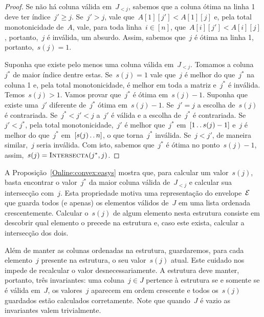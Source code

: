 \begin{proof}
Se não há coluna válida em~$J_{<j}$, sabemos que a coluna ótima na linha 1 deve ter índice~$j' \geq j$. Se~$j' > j$, vale que~${ A[1][j'] < A[1][j] }$ e, pela total monotonicidade de~$A$, vale, para toda linha~${ i \in [n] }$, que~${ A[i][j'] < A[i][j] }$, portanto,~$j$ é inválida, um absurdo. Assim, sabemos que~$j$ é ótima na linha 1, portanto,~${s(j) = 1}$.

Suponha que existe pelo menos uma coluna válida em~$J_{<j}$. Tomamos a coluna~$j^*$ de maior índice dentre estas. Se~${ s(j) = 1 }$ vale que~$j$ é melhor do que~$j^*$ na coluna 1 e, pela total monotonicidade, é melhor em toda a matriz e~$j^*$ é inválida. Temos~${ s(j) > 1 }$. Vamos provar que~$j^*$ é ótima em~${ s(j) - 1 }$. Suponha que existe uma~$j'$ diferente de~$j^*$ ótima em~$s(j) - 1$. Se~${ j' = j }$ a escolha de~$s(j)$ é contrariada. Se~${ j^* < j' < j }$ a~$j'$ é válida e a escolha de~$j^*$ é contrariada. Se~${ j' < j^* }$, pela total monotonicidade,~$j'$ é melhor que~$j^*$ em~$[1 \,.\,.\, s(j) - 1]$ e~$j$ é melhor do que~$j^*$ em~$[s(j) \,.\,.\, n]$, o que torna~$j^*$ inválida. Se~${ j < j' }$, de maneira similar,~$j$ seria inválida.  Com isto, sabemos que~$j^*$ é ótima no ponto~$s(j) - 1$, assim,~${s(j) = \textsc{Intersecta}(j^*,j)}$.
\end{proof}

A Proposição~\ref{Online:convex:easys} mostra que, para calcular um valor~$s(j)$, basta encontrar o valor~$j^*$ da maior coluna válida de~$J_{<j}$ e calcular sua intersecção com~$j$. Esta propriedade motiva uma representação do envelope~$\mathcal{E}$ que guarda todos (e apenas) os elementos válidos de~$J$ em uma lista ordenada crescentemente. Calcular o~$s(j)$ de algum elemento nesta estrutura consiste em descobrir qual elemento o precede na estrutura e, caso este exista, calcular a intersecção dos dois.

Além de manter as colunas ordenadas na estrutura, guardaremos, para cada elemento~$j$ presente na estrutura, o seu valor~$s(j)$ atual. Este cuidado nos impede de recalcular o valor desnecessariamente. A estrutura deve manter, portanto, três invariantes: uma coluna~$j \in J$ pertence à estrutura se e somente se é válida em~$J$, os valores~$j$ aparecem em ordem crescente e todos os~$s(j)$ guardados estão calculados corretamente. Note que quando~$J$ é vazio as invariantes valem trivialmente.

